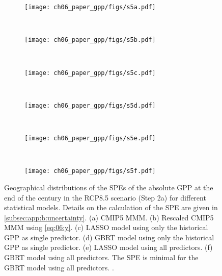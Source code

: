 \begin{figure}[p]
  \centering
  \begin{subfigure}[b]{\SubfigureWidth{}}
    \texttt{[image: ch06\_paper\_gpp/figs/s5a.pdf]}
    \caption{}
    \label{fig:app:b:step2a_results_errors:a}
  \end{subfigure}
  ~
  \begin{subfigure}[b]{\SubfigureWidth{}}
    \texttt{[image: ch06\_paper\_gpp/figs/s5b.pdf]}
    \caption{}
    \label{fig:app:b:step2a_results_errors:b}
  \end{subfigure}
  \\
  \begin{subfigure}[b]{\SubfigureWidth{}}
    \texttt{[image: ch06\_paper\_gpp/figs/s5c.pdf]}
    \caption{}
    \label{fig:app:b:step2a_results_errors:c}
  \end{subfigure}
  ~
  \begin{subfigure}[b]{\SubfigureWidth{}}
    \texttt{[image: ch06\_paper\_gpp/figs/s5d.pdf]}
    \caption{}
    \label{fig:app:b:step2a_results_errors:d}
  \end{subfigure}
  \\
  \begin{subfigure}[b]{\SubfigureWidth{}}
    \texttt{[image: ch06\_paper\_gpp/figs/s5e.pdf]}
    \caption{}
    \label{fig:app:b:step2a_results_errors:e}
  \end{subfigure}
  ~
  \begin{subfigure}[b]{\SubfigureWidth{}}
    \texttt{[image: ch06\_paper\_gpp/figs/s5f.pdf]}
    \caption{}
    \label{fig:app:b:step2a_results_errors:f}
  \end{subfigure}
  \caption[
    Geographical distributions of the \aclp{SPE} of the absolute \acf{GPP} at
    the end of the  century in the \acs{RCP}8.5 scenario (Step 2a) for
    different statistical models.
  ]{
    Geographical distributions of the \acfp{SPE} of the absolute \acf{GPP} at
    the end of the  century in the \acs{RCP}8.5 scenario (Step 2a) for
    different statistical models. Details on the calculation of the \acs{SPE}
    are given in \cref{subsec:app:b:uncertainty}. (a) \acs{CMIP}5 \acf{MMM}.
    (b) Rescaled \acs{CMIP}5 \acs{MMM} using \cref{eq:06:y}. (c) \Acf{LASSO}
    model using only the historical \acs{GPP} as single predictor. (d)
    \Acf{GBRT} model using only the historical \acs{GPP} as single predictor.
    (e) \acs{LASSO} model using all predictors. (f) \acs{GBRT} model using all
    predictors. The \acs{SPE} is minimal for the \acs{GBRT} model using all
    predictors. .
  }
  \label{fig:app:b:step2a_results_errors}
\end{figure}

